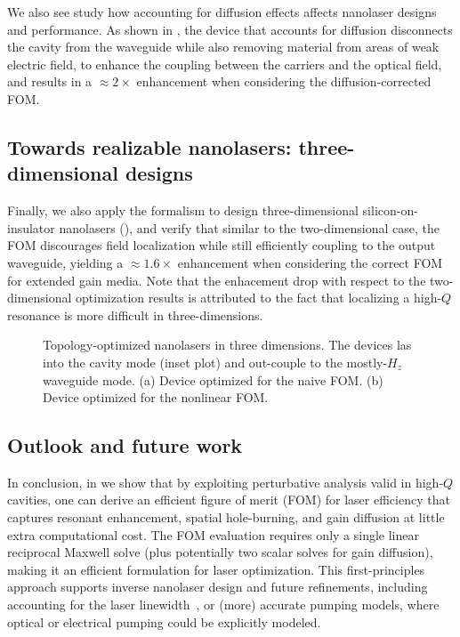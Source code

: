 We also see study how accounting for diffusion effects
affects nanolaser designs and performance. As shown in , the device that accounts for diffusion disconnects the cavity from the waveguide while also removing
material from areas of weak electric field, to 
enhance the coupling between the carriers and the optical field, and results in a $\approx 2\times$ enhancement when considering the diffusion-corrected FOM. 

\subsection*{Towards realizable nanolasers: three-dimensional designs}

Finally, we also apply the formalism to design three-dimensional silicon-on-insulator nanolasers (), 
and verify that similar to the two-dimensional case, the FOM discourages field localization while still efficiently coupling to the output waveguide, yielding a $\approx 1.6\times$
enhancement when considering the correct FOM for extended gain media. Note that the enhacement drop with respect to the two-dimensional optimization results
is attributed to the fact that localizing a high-$Q$ resonance is more difficult in three-dimensions.

\begin{figure}[tb]
    \centering
    \caption{Topology-optimized nanolasers in three dimensions. The devices las into the cavity mode (inset plot) and out-couple to the
    mostly-$H_z$ waveguide mode. (a) Device optimized for the naive FOM. (b) Device optimized for the nonlinear FOM.}
    \label{fig:laser3d}
\end{figure}

\subsection*{Outlook and future work}

In conclusion, in \cite{ownpub4} we show that by exploiting perturbative analysis valid in high-$Q$ cavities, one can derive  
an efficient figure of merit (FOM) for laser efficiency that captures resonant enhancement,  
spatial hole-burning, and gain diffusion at little extra computational cost. The FOM evaluation requires only a  
single linear reciprocal Maxwell solve (plus potentially two scalar solves for gain diffusion), making it 
an efficient formulation for laser optimization. This first-principles approach supports inverse nanolaser design and  
future refinements, including accounting for the laser linewidth~\cite{pick}, or (more) accurate pumping models, where optical or electrical pumping could be explicitly
modeled.
